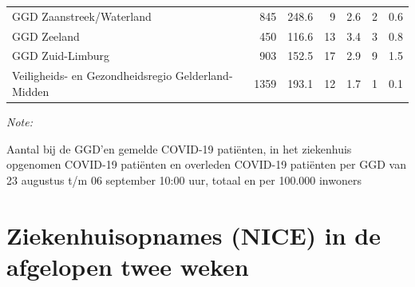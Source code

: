 \documentclass[
  english,
  man,floatsintext]{apa6}
\begin{document}
\begin{table}
\begin{threeparttable}
\begin{tabular}{lrrrrrr}
GGD Zaanstreek/Waterland & 845 & 248.6 & 9 & 2.6 & 2 & 0.6\\
GGD Zeeland & 450 & 116.6 & 13 & 3.4 & 3 & 0.8\\
GGD Zuid-Limburg & 903 & 152.5 & 17 & 2.9 & 9 & 1.5\\
Veiligheids- en Gezondheidsregio Gelderland-Midden & 1359 & 193.1 & 12 & 1.7 & 1 & 0.1\\
\bottomrule
\end{tabular}
\begin{tablenotes}
\item \textit{Note: } 
\item Aantal bij de GGD’en gemelde COVID-19 patiënten, in het ziekenhuis opgenomen COVID-19 patiënten en overleden COVID-19 patiënten per GGD van 23 augustus t/m 06 september 10:00 uur, totaal en per 100.000 inwoners
\end{tablenotes}
\end{threeparttable}
\endgroup{}
\end{table}

\newpage

\hypertarget{ziekenhuisopnames-nice-in-de-afgelopen-twee-weken}{%
\section{Ziekenhuisopnames (NICE) in de afgelopen twee weken}\label{ziekenhuisopnames-nice-in-de-afgelopen-twee-weken}}
\end{document}
